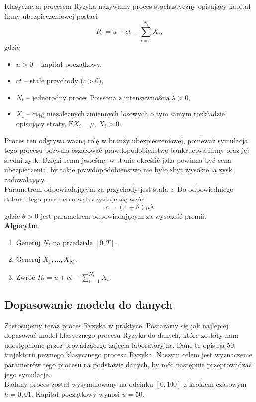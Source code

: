 \documentclass[12pt]{mwart}
\begin{document}
	\noindent Klasycznym procesem Ryzyka nazywamy proces stochastyczny opisujący kapitał firmy ubezpieczeniowej postaci
	$$ R_t = u + ct - \sum_{i=1}^{N_t} X_i, $$
	gdzie
	\begin{itemize}[label={\boldmath $\cdot$}]
		\item $u > 0$ -- kapitał początkowy,
		\item $ct$ -- stałe przychody ($c > 0$),
		\item $N_t$ -- jednorodny proces Poissona z intensywnością $\lambda > 0$,
		\item $X_i$ -- ciąg niezależnych zmiennych losowych o tym samym rozkładzie opisujący straty, $\mathrm{E}X_i = \mu$, $X_i > 0$.
	\end{itemize}
	Proces ten odgrywa ważną rolę w branży ubezpieczeniowej, ponieważ symulacja tego procesu pozwala oszacować prawdopodobieństwo bankructwa firmy oraz jej średni zysk. Dzięki temu jesteśmy w stanie określić jaka powinna być cena ubezpieczenia, by takie prawdopodobieństwo nie było zbyt wysokie, a zysk zadowalający.\vspace{1.5mm}\\
	Parametrem odpowiadającym za przychody jest stała $c$. Do odpowiedniego doboru tego parametru wykorzystuje się wzór
	\begin{equation}\label{c}
		c = (1 + \theta)\mu\lambda
	\end{equation}
	gdzie $\theta > 0$ jest parametrem odpowiadającym za wysokość premii.\\
	
	\noindent \textbf{Algorytm}
	\begin{enumerate}
		\item Generuj $N_t$ na przedziale $[0, T]$.
		\item Generuj $X_1, \dots, X_{N_t}$.
		\item Zwróć $R_t = u + ct - \sum\limits_{i=1}^{N_t} X_i$.
	\end{enumerate}
	
	
	
	\subsection{Dopasowanie modelu do danych}
	
	\noindent Zastosujemy teraz proces Ryzyka w praktyce. Postaramy się jak najlepiej dopasować model klasycznego procesu Ryzyka do danych, które zostały nam udostępnione przez prowadzącego zajęcia laboratoryjne. Dane te opisują 50 trajektorii pewnego klasycznego procesu Ryzyka. Naszym celem jest wyznaczenie parametrów tego procesu na podstawie danych, by móc następnie przeprowadzać jego symulacje.\vspace{1.5mm}\\
	Badany proces został wysymulowany na odcinku $[0, 100]$ z krokiem czasowym $h = 0,01$. Kapitał początkowy wynosi $u = 50$.
	
\end{document}
